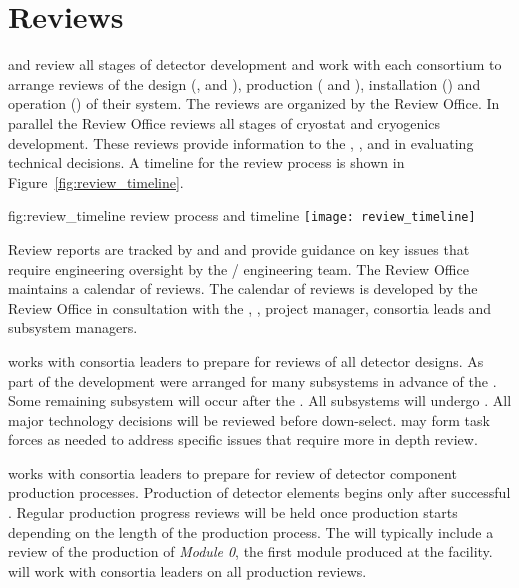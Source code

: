 \chapter{Reviews}
\label{vl:tc-review}

 and  review all stages of detector development
and work with each consortium to arrange reviews of the design
(,  and ), production (
and ), installation () and operation
() of their system. The reviews are organized by the
 Review Office. In parallel the Review Office reviews all
stages of  cryostat and cryogenics development.  These
reviews provide information to the , , and 
in evaluating technical decisions. A timeline for the review process
is shown in Figure~\ref{fig:review_timeline}.
\begin{dunefigure}{fig:review_timeline}
  { review process and timeline}
  \texttt{[image: review\_timeline]}
\end{dunefigure}
Review reports are tracked by  and  and provide
guidance on key issues that require engineering oversight by the
/ engineering team. The Review Office maintains a
calendar of  reviews. The calendar of reviews is developed
by the Review Office in consultation with the ,
,  project manager, consortia leads and
 subsystem managers.

 works with consortia leaders to prepare for reviews of all detector
designs.  As part of the  development  were
arranged for many subsystems in advance of the . Some
remaining subsystem  will occur after the . All
subsystems will undergo .  All major technology decisions
will be reviewed before down-select.   may form task forces
as needed to address specific issues that require more in depth
review.


 works with consortia leaders to prepare for review of
detector component production processes.  Production of detector
elements begins only after successful . Regular production
progress reviews will be held once production starts depending on the
length of the production process. The  will typically
include a review of the production of \textit{Module 0}, the first
module produced at the facility.  will work with consortia
leaders on all production reviews.

